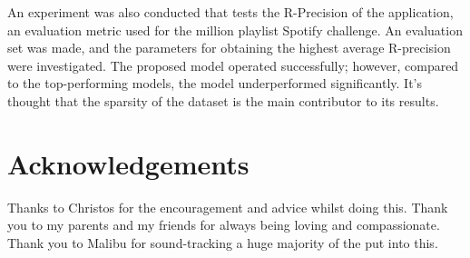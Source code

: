 An experiment was also conducted that tests the R-Precision of the application, an evaluation metric used for the million playlist Spotify challenge. An evaluation set was made, and the parameters for obtaining the highest average R-precision were investigated. The proposed model operated successfully; however, compared to the top-performing models, the model underperformed significantly. It's thought that the sparsity of the dataset is the main contributor to its results.

\frontmatter

\singlespacing

\setlength{\parskip}{0ex} %

\clearpage
{}
\tableofcontents
\clearpage
{}
{}
\listoffigures
\clearpage
{}
{}


\setlength{\parskip}{1ex plus 0.2ex minus 0.2ex} %

\onehalfspacing

\chapter{Acknowledgements}

Thanks to Christos for the encouragement and advice whilst doing this. Thank you to my parents and my friends for always being loving and compassionate. Thank you to Malibu for sound-tracking a huge majority of the put into this.